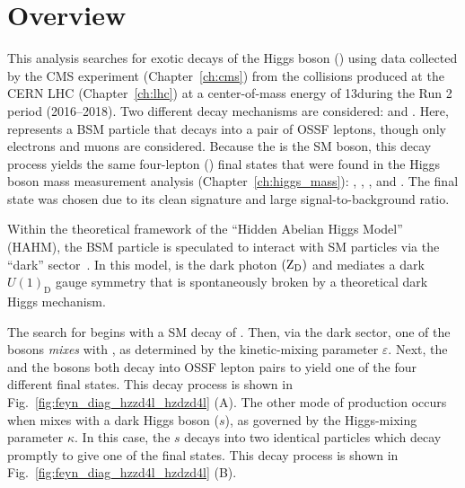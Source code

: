 \section{Overview}
This analysis searches for exotic decays of the Higgs boson (\PH) using data collected by the CMS experiment (Chapter~\ref{ch:cms}) from the \pp collisions produced at the CERN LHC (Chapter~\ref{ch:lhc}) at a center-of-mass energy of 13\TeV during the Run 2 period (2016--2018).
Two different decay mechanisms are considered: \htozx and \htoxx.
Here, \PX represents a BSM particle that decays into a pair of OSSF leptons, though only electrons and muons are considered.
Because the \PZ is the SM \PZ boson, this decay process yields the same four-lepton (\fourl) final states that were found in the Higgs boson mass measurement analysis (Chapter~\ref{ch:higgs_mass}):
\foure, \fourmu, \twoetwomu, and \twomutwoe.
The \fourl final state was chosen due to its clean signature and large signal-to-background ratio.

Within the theoretical framework of the ``Hidden Abelian Higgs Model'' (HAHM), the BSM particle \PX is speculated to interact with SM particles via the ``dark'' sector~\cite{Curtin:2014cca, Curtin:2013fra, Davoudiasl:2013aya}.
In this model, \PX is the dark photon $\left( \mathrm{Z}_\text{D} \right)$ and mediates a dark $U(1)_\text{D}$ gauge symmetry that is spontaneously broken by a theoretical dark Higgs mechanism.

The search for \PZD begins with a SM decay of \htozznostar.
Then, via the dark sector, one of the \PZ bosons \emph{mixes} with \PZD, as determined by the kinetic-mixing parameter $\varepsilon$.
Next, the \PZD and the \PZ bosons both decay into OSSF lepton pairs to yield one of the four different \fourl final states.
This decay process is shown in Fig.~\ref{fig:feyn_diag_hzzd4l_hzdzd4l} (A).
The other mode of \PZD production occurs when \PH mixes with a dark Higgs boson ($s$), as governed by the Higgs-mixing parameter $\mathcal{\kappa}$.
In this case, the $s$ decays into two identical \PZD particles which decay promptly to give one of the \fourl final states.
This decay process is shown in Fig.~\ref{fig:feyn_diag_hzzd4l_hzdzd4l} (B).

